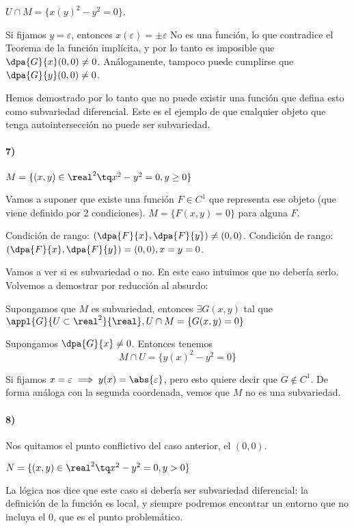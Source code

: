 $U \cap M = \{x(y)^2-y^2 = 0\}$.

Si fijamos $y=\varepsilon$, entonces $x(\varepsilon) = \pm \varepsilon$ No es una función, lo que contradice el Teorema de la función implícita, y por lo tanto es imposible que $\dpa{G}{x}(0,0) \neq 0$. Análogamente, tampoco puede cumplirse que $\dpa{G}{y}(0,0) \neq 0$.

Hemos demostrado por lo tanto que no puede existir una función que defina esto como subvariedad diferencial. Este es el ejemplo de que cualquier objeto que tenga autointersección no puede ser subvariedad.

\paragraph{7)} $M = \{(x,y) \in \real^2 \tq x^2-y^2 = 0, y\ge 0\}$

Vamos a suponer que existe una función $F \in C^1$ que representa ese objeto (que viene definido por 2 condiciones). $M = \{F(x,y) = 0\}$ para alguna $F$.

Condición de rango: $\left(\dpa{F}{x},\dpa{F}{y}\right) \neq (0,0)$.
 Condición de rango: $\left(\dpa{F}{x},\dpa{F}{y}\right) = (0,0), x=y=0$.

 Vamos a ver si es subvariedad o no. En este caso intuimos que no debería serlo. Volvemos a demostrar por reducción al absurdo:

 Supongamos que $M$ es subvariedad, entonces $\exists G(x,y)$ tal que $\appl{G}{U\subset\real^2}{\real}, U \cap M = \{G(x,y) = 0\}$

 Supongamos $\displaystyle \dpa{G}{x}\neq 0$. Entonces tenemos \[ M\cap U = \{y(x)^2 - y^2 = 0\} \]

 Si fijamos $x=\varepsilon \implies y(x) = \abs{\varepsilon}$, pero esto quiere decir que $G \notin C^1$. De forma análoga con la segunda coordenada, vemos que $M$ no es una subvariedad.

\paragraph{8)} Nos quitamos el punto conflictivo del caso anterior, el $(0,0)$.

$N = \{(x,y)\in \real^2 \tq x^2-y^2 = 0, y>0\}$

La lógica nos dice que este caso si debería ser subvariedad diferencial:  la definición de la función es local, y siempre podremos encontrar un entorno que no incluya el 0, que es el punto problemático.

